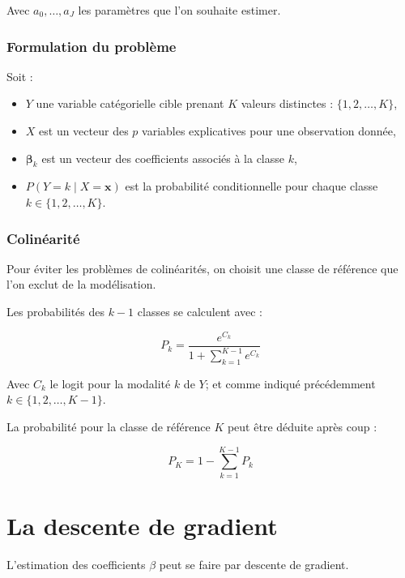 \documentclass[10pt,french]{report}
\begin{document}
    Avec $a_0, \ldots, a_J$ les paramètres que l'on souhaite estimer.

    \subsubsection{Formulation du problème}

    Soit :
    \begin{itemize}
    	\item $Y$ une variable catégorielle cible prenant $K$ valeurs distinctes : $\{1, 2, \dots, K\}$,
    	\item $X$ est un vecteur des $p$ variables explicatives pour une observation donnée,
    	\item $\boldsymbol{\beta}_k$ est un vecteur des coefficients associés à la classe $k$,
    	\item $P(Y = k \mid X = \mathbf{x})$ est la probabilité conditionnelle pour chaque classe $k \in \{1, 2, \dots, K\}$.
    \end{itemize}

    \subsubsection{Colinéarité}

    Pour éviter les problèmes de colinéarités, on choisit une classe de référence que l'on exclut de la modélisation.

    Les probabilités des $k-1$ classes se calculent avec :

    \begin{equation}
    	P_k = \frac{e^{C_k}}{1+\sum_{k=1}^{K-1}e^{C_k}}
    \end{equation}

    Avec $C_k$ le logit pour la modalité $k$ de $Y$; et comme indiqué précédemment $k \in \{1, 2, \dots, K-1\}$.

    La probabilité pour la classe de référence $K$ peut être déduite après coup :

    \begin{equation}
    	P_K = 1 - \sum_{k=1}^{K-1}P_k
    \end{equation}

    \section{La descente de gradient}

    L'estimation des coefficients $\beta$ peut se faire par descente de gradient.
\end{document}
